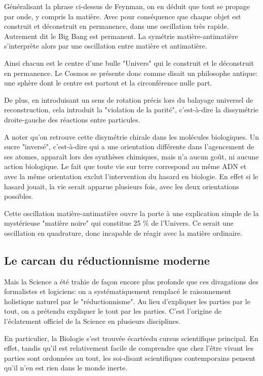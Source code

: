 \documentclass[a4paper,12pt]{article}
\begin{document}
Généralisant la phrase ci-dessus de Feynman, on en déduit que tout se propage par onde, y compris la matière. Avec pour conséquence que chaque objet est construit et déconstruit en permanence, dans une oscillation très rapide. Autrement dit le Big Bang est permanent. La symétrie matière-antimatière s'interprète alors par une oscillation entre matière et antimatière. 

Ainsi chacun est le centre d'une bulle "Univers" qui le construit et le déconstruit en permanence. Le Cosmos se présente donc comme disait un philosophe antique: une sphère dont le centre est partout et la circonférence nulle part.

De plus, en introduisant un sens de rotation précis lors du balayage universel de reconstruction, cela introduit la "violation de la parité", c'est-à-dire la dissymétrie droite-gauche des réactions entre particules. 

A noter qu'on retrouve cette disymétrie chirale dans les molécules biologiques. Un sucre "inversé", c'est-à-dire qui a une orientation différente dans l'agencement de ses atomes, apparaît lors des synthèses chimiques, mais n'a aucun goût, ni aucune action biologique. Le fait que toute vie sur terre correspond au même ADN et avec la même orientation exclut l'intervention du hasard en biologie. En effet si le hasard jouait, la vie serait apparue plusieurs fois, avec les deux orientations possibles.

Cette oscillation matière-antimatière ouvre la porte à une explication simple de la mystérieuse "matière noire" qui constitue 25 \% de l'Univers. Ce serait une oscillation en quadrature, donc incapable de réagir avec la matière ordinaire. 


\subsection{Le carcan du réductionnisme moderne}

    Mais la Science a été trahie de façon encore plus profonde que ces divagations des formalistes et logiciens: on a systématiquement remplacé le raisonnement holistique naturel par le "réductionnisme". Au lieu d'expliquer les parties par le tout, on a prétendu expliquer le tout par les parties. C'est l'origine de l'éclatement officiel de la Science en plusieurs disciplines.

     En particulier, la Biologie s'est trouvée écartéedu cursus scientifique principal.  En effet, tandis qu'il est relativement facile de comprendre que chez l'être vivant les parties sont ordonnées au tout, les soi-disant scientifiques contemporains pensent qu'il n'en est rien dans le monde inerte. 
\end{document}
